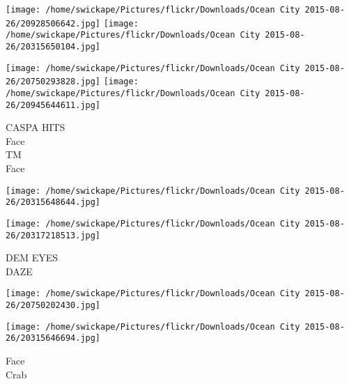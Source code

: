 \documentclass[10pt,letterpaper]{article}
\begin{document}
\texttt{[image: /home/swickape/Pictures/flickr/Downloads/Ocean City 2015-08-26/20928506642.jpg]}
\texttt{[image: /home/swickape/Pictures/flickr/Downloads/Ocean City 2015-08-26/20315650104.jpg]}

\texttt{[image: /home/swickape/Pictures/flickr/Downloads/Ocean City 2015-08-26/20750293828.jpg]}
\texttt{[image: /home/swickape/Pictures/flickr/Downloads/Ocean City 2015-08-26/20945644611.jpg]}

CASPA HITS\\
Face\\
TM\\
Face\\
\pagebreak

\texttt{[image: /home/swickape/Pictures/flickr/Downloads/Ocean City 2015-08-26/20315648644.jpg]}

\vspace{0.25in}
\texttt{[image: /home/swickape/Pictures/flickr/Downloads/Ocean City 2015-08-26/20317218513.jpg]}

DEM EYES\\
DAZE\\
\pagebreak

\texttt{[image: /home/swickape/Pictures/flickr/Downloads/Ocean City 2015-08-26/20750202430.jpg]}

\vspace{0.25in}
\texttt{[image: /home/swickape/Pictures/flickr/Downloads/Ocean City 2015-08-26/20315646694.jpg]}

Face\\
Crab\\
\pagebreak
\end{document}
